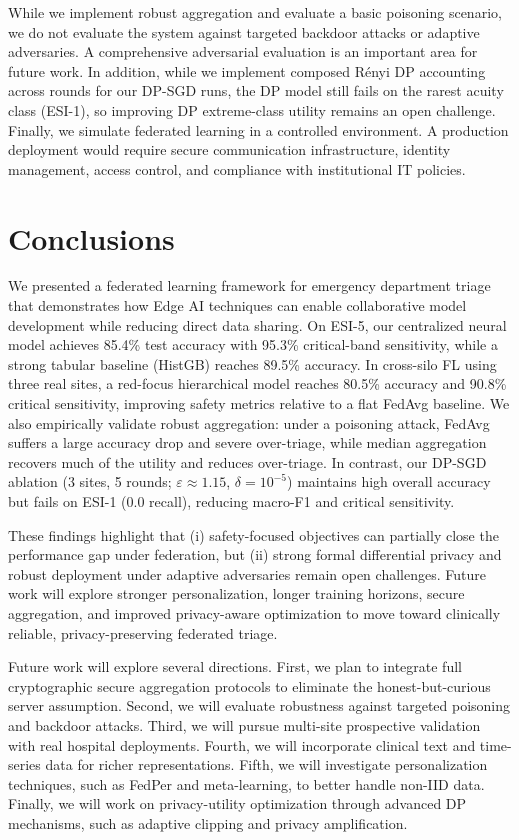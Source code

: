 \documentclass[journal,article,submit,pdftex,moreauthors]{Definitions/mdpi}
\begin{document}
While we implement robust aggregation and evaluate a basic poisoning scenario, we do not evaluate the system against targeted backdoor attacks or adaptive adversaries. A comprehensive adversarial evaluation is an important area for future work. In addition, while we implement composed R\'enyi DP accounting across rounds for our DP-SGD runs, the DP model still fails on the rarest acuity class (ESI-1), so improving DP extreme-class utility remains an open challenge. Finally, we simulate federated learning in a controlled environment. A production deployment would require secure communication infrastructure, identity management, access control, and compliance with institutional IT policies.

\section{Conclusions}\label{sec:conclusion}

We presented a federated learning framework for emergency department triage that demonstrates how Edge AI techniques can enable collaborative model development while reducing direct data sharing. On ESI-5, our centralized neural model achieves 85.4\% test accuracy with 95.3\% critical-band sensitivity, while a strong tabular baseline (HistGB) reaches 89.5\% accuracy. In cross-silo FL using three real sites, a red-focus hierarchical model reaches 80.5\% accuracy and 90.8\% critical sensitivity, improving safety metrics relative to a flat FedAvg baseline. We also empirically validate robust aggregation: under a poisoning attack, FedAvg suffers a large accuracy drop and severe over-triage, while median aggregation recovers much of the utility and reduces over-triage. In contrast, our DP-SGD ablation (3 sites, 5 rounds; $\varepsilon\approx1.15$, $\delta=10^{-5}$) maintains high overall accuracy but fails on ESI-1 (0.0 recall), reducing macro-F1 and critical sensitivity.

These findings highlight that (i) safety-focused objectives can partially close the performance gap under federation, but (ii) strong formal differential privacy and robust deployment under adaptive adversaries remain open challenges. Future work will explore stronger personalization, longer training horizons, secure aggregation, and improved privacy-aware optimization to move toward clinically reliable, privacy-preserving federated triage.

Future work will explore several directions. First, we plan to integrate full cryptographic secure aggregation protocols to eliminate the honest-but-curious server assumption. Second, we will evaluate robustness against targeted poisoning and backdoor attacks. Third, we will pursue multi-site prospective validation with real hospital deployments. Fourth, we will incorporate clinical text and time-series data for richer representations. Fifth, we will investigate personalization techniques, such as FedPer and meta-learning, to better handle non-IID data. Finally, we will work on privacy-utility optimization through advanced DP mechanisms, such as adaptive clipping and privacy amplification.
\end{document}
